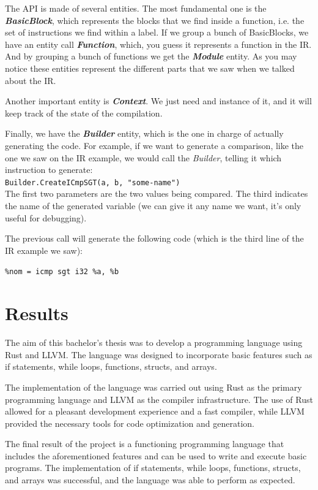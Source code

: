 ﻿\documentclass[10pt,a4paper,twocolumn,twoside]{article}
\begin{document}
The API is made of several entities. The most fundamental one is the
\textbf{\textit{BasicBlock}}, which represents the blocks that we find inside a
function, i.e. the set of instructions we find within a label. If we group a
bunch of BasicBlocks, we have an entity call \textbf{\textit{Function}}, which,
you guess it represents a function in the IR. And by grouping a bunch of
functions we get the \textbf{\textit{Module}} entity. As you may notice these
entities represent the different parts that we saw when we talked about the IR.

Another important entity is \textit{\textbf{Context}}. We just need and instance of it, 
and it will keep track of the state of the compilation.

Finally, we have the \textit{\textbf{Builder}} entity, which is the one in charge of 
actually generating the code. For example, if we want to generate a comparison,
like the one we saw on the IR example, we would call the \textit{Builder}, 
telling it which instruction to generate:\\

\texttt{Builder.CreateICmpSGT(a, b, "some-name")}
\\

The first two parameters are the two values being compared. The third 
indicates the name of the generated variable (we can give it any name we want,
it's only useful for debugging).

The previous call will generate the following code (which is the third line of
the IR example we saw):

\texttt{\%nom = icmp sgt i32 \%a, \%b}

\section{Results}
The aim of this bachelor's thesis was to develop a programming language using
Rust and LLVM. The language was designed to incorporate basic features such as
if statements, while loops, functions, structs, and arrays.

The implementation of the language was carried out using Rust as the primary
programming language and LLVM as the compiler infrastructure. The use of Rust
allowed for a pleasant development experience and a fast compiler, while LLVM 
provided the necessary tools for code optimization and generation.

The final result of the project is a functioning programming language that
includes the aforementioned features and can be used to write and execute basic
programs. The implementation of if statements, while loops, functions, structs,
and arrays was successful, and the language was able to perform as expected.
\end{document}
